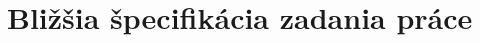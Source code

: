 \documentclass[11pt,a4paper,oneside,final]{book}
\begin{document}


\section{Bližšia špecifikácia zadania práce}
\end{document}
